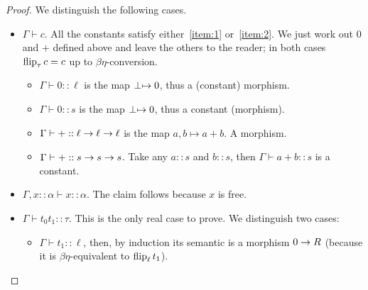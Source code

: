 \begin{proof}
  We distinguish the following cases.
  \begin{itemize}
  \item $\Gamma\vdash c$. All the constants satisfy
    either~\ref{item:1} or~\ref{item:2}. We just work out $0$ and $+$
    defined above and leave the others to the reader; in both cases
    $\operatorname{flip}_\tau c=c$ up to $\beta\eta$-conversion.
    \begin{itemize}
    \item $\Gamma\vdash0::\ell$ is the map $\perp\mapsto 0$, thus a
      (constant) morphism.
    \item $\Gamma\vdash0::s$ is the map $\perp\mapsto 0$, thus a constant
      (morphism).
    \item $\Gamma\vdash+::\ell\rightarrow\ell\rightarrow\ell$ is the map $a,b\mapsto
      a+b$. A morphism.
    \item $\Gamma\vdash+::s\rightarrow s\rightarrow s$. Take any $a::s$ and $b::s$, then
      $\Gamma\vdash a+b::s$ is a constant.
    \end{itemize}
  \item $\Gamma,x::\alpha\vdash x::\alpha$. The claim follows because
    $x$ is free.
  \item $\Gamma\vdash t_0t_1::\tau$. This is the only real case
    to prove. We distinguish two cases:
    \begin{itemize}
    \item $\Gamma\vdash t_1::\ell$, then, by induction its semantic is
      a morphism $0\rightarrow R$ (because it is $\beta\eta$-equivalent to
      $\operatorname{flip}_\ell t_1$). 


\end{itemize}
\end{itemize}
\end{proof}
